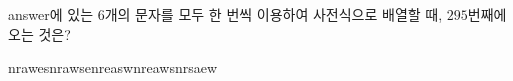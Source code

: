 \hspace*{2mm}\begin{minipage}[t]{\dimexpr\linewidth-2mm\relax}\vspace{0pt}
answer에 있는 $6$개의 문자를 모두 한 번씩 이용하여 사전식으로 배열할 때, $295$번째에 오는 것은?
\begin{choices32}{nrawes}{nrawse}{nreasw}{nreaws}{nrsaew}\end{choices32}\end{minipage}
